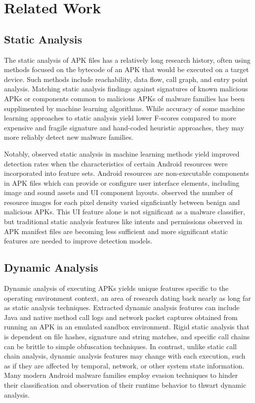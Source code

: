 \documentclass[preprint,1p]{elsarticle}
\begin{document}
\section{Related Work}
\subsection[static]{Static Analysis}
The static analysis of APK files has a relatively long research history, often using methods focused on the bytecode of an APK that would be executed on a target device.  Such methods include reachability, data flow, call graph, and entry point analysis.\cite{10.1145/2746266.2746271}  Matching static analysis findings against signatures of known malicious APKs or components common to malicious APKs of malware families has been supplimented by machine learning algorithms.  While accuracy of some machine learning approaches to static analysis yield lower F-scores compared to more expensive and fragile signature and hand-coded heuristic approaches\cite{10.1145/3029806.3029823}, they may more reliably detect new malware families.

Notably, \citet{10.1145/3290480.3290493} observed static analysis in machine learning methods yield improved detection rates when the characteristics of certain Android resources were incorporated into feature sets.  Android resources are non-executable components in APK files which can provide or configure user interface elements, including image and sound assets and UI component layouts.  \citet{10.1145/3290480.3290493} observed the number of resource images for each pixel density varied signficiantly between benign and malicious APKs.  This UI feature alone is not significant as a malware classifier, but traditional static analysis features like intents and permissions observed in APK manifest files are becoming less sufficient and more significant static features are needed to improve detection models.\cite{10.1109/TrustCom50675.2020.00195}

\subsection[dynamic]{Dynamic Analysis}
Dynamic analysis of executing APKs yields unique features specific to the operating environment context, an area of research dating back nearly as long far as static analysis techniques.\cite{10.1007/s10844-010-0148-x}  Extracted dynamic analysis features can include Java and native method call logs and network packet captures obtained from running an APK in an emulated sandbox environment.\cite{10.1145/2480362.2480701}  Rigid static analysis that is dependent on file hashes, signature and string matches, and specific call chains can be brittle to simple obfuscation techniques.  In contrast, unlike static call chain analysis, dynamic analysis features may change with each execution, such as if they are affected by temporal, network, or other system state information.  Many modern Android malware families employ evasion techniques to hinder their classification and observation of their runtime behavior to thwart dynamic analysis.\cite{10.1145/3150376.3150378}
\end{document}
